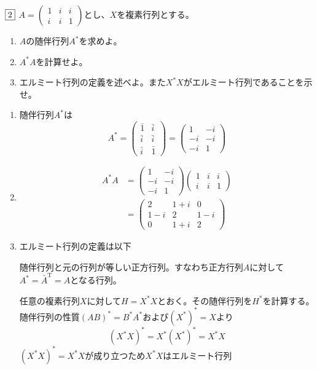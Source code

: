 \begin{tcolorbox} %
	$\fbox{2}$ $A= \begin{pmatrix}1& i& i\\ i& i& 1\end{pmatrix}$とし、$X$を複素行列とする。
\begin{enumerate}
	\item $A$の随伴行列$A^{*}$を求めよ。
	\item $A^{*}A$を計算せよ。
	\item エルミート行列の定義を述べよ。また$X^{*}X$がエルミート行列であることを示せ。
\end{enumerate}
\end{tcolorbox}

\begin{souanswer} %
\begin{enumerate}
	\item 随伴行列$A^{*}$は
\begin{equation*}
	A^{*}= 
\begin{pmatrix}
	\bar{1}& \bar{i}\\
	\bar{i}& \bar{i}\\
	\bar{i}& \bar{1}
\end{pmatrix}
	=
\begin{pmatrix}
	1& -i\\
	-i& -i\\
	-i& 1
\end{pmatrix}
\end{equation*}
	\item
\begin{align*}
	A^{*}A
	&=
\begin{pmatrix}
	1& -i\\
	-i& -i\\
	-i& 1
\end{pmatrix}
\begin{pmatrix}
	1& i& i\\
	i& i& 1
\end{pmatrix}\\
	&= 
\begin{pmatrix}
	2& 1+ i& 0\\
	1- i& 2& 1- i\\
	0& 1+ i& 2
\end{pmatrix}
\end{align*}
	\item エルミート行列の定義は以下
\begin{tcolorbox}
	随伴行列と元の行列が等しい正方行列。すなわち正方行列$A$に対して$A^*= \bar{A}^\mathrm{T}= A$となる行列。
\end{tcolorbox}
	任意の複素行列$X$に対して$H= X^*X$とおく。その随伴行列を$H^*$を計算する。随伴行列の性質$(AB)^*= B^*A^*$および$(X^*)^*= X$より
\begin{equation*}
	(X^*X)^*= X^*(X^*)^*= X^*X
\end{equation*}
	$(X^*X)^*= X^*X$が成り立つため$X^*X$はエルミート行列
\end{enumerate}
\end{souanswer}